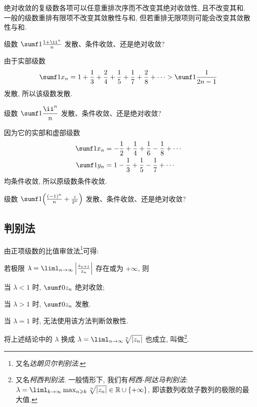 绝对收敛的复级数各项可以任意重排次序而不改变其绝对收敛性, 且不改变其和.
一般的级数重排有限项不改变其敛散性与和, 但若重排无限项则可能会改变其敛散性与和.

\begin{example}
  级数 $\sumf1 \frac{1+\ii ^n}n$ 发散、条件收敛、还是绝对收敛?
\end{example}

\begin{solution}
  由于实部级数
  \[
    \sumf1 x_n
    =1+\frac13+\frac24+\frac15+\frac17+\frac28+\cdots
    >\sumf1 \frac1{2n-1}
  \]
  发散, 所以该级数发散.
\end{solution}

\begin{example}
  \label{exam:lni}
  级数 $\sumf1 \dfrac{\ii ^n}n$ 发散、条件收敛、还是绝对收敛?
\end{example}

\begin{solution}
  因为它的实部和虚部级数
  \begin{align*}
    \sumf1 x_n&=-\half +\frac14+\frac16-\frac18+\cdots\\
    \sumf1 y_n&=1-\frac13+\frac15-\frac17+\cdots
  \end{align*}
  均条件收敛, 所以原级数条件收敛.
\end{solution}

\begin{exercise}
  级数 $\sumf1 \Bigl(\frac{(-1)^n}n+\frac i{2^n}\Bigr)$ 发散、条件收敛、还是绝对收敛?
\end{exercise}


\subsection{判别法}

由正项级数的比值审敛法\footnote{又名\emph{达朗贝尔判别法}.}可得:
\begin{theorem}[比值审敛法]
  若极限 $\lambda=\liml_{n\ra\infty}\abs{\frac{z_{n+1}}{z_n}}$ 存在或为 $+\infty$, 则
  \begin{enumpar}
    \item 当 $\lambda<1$ 时, $\sumf0 z_n$ 绝对收敛;
    \item 当 $\lambda>1$ 时, $\sumf0 z_n$ 发散.
  \end{enumpar}
\end{theorem}
当 $\lambda=1$ 时, 无法使用该方法判断敛散性.

将上述结论中的 $\lambda$ 换成 $\lambda=\liml_{n\ra\infty}\sqrt[n]{\abs{z_n}}$ 也成立, 叫做\footnote{
  又名\emph{柯西判别法}.
  一般情形下, 我们有\emph{柯西-阿达马判别法}: 
  $\lambda=\liml_{k\ra\infty}\max_{n\ge k}\sqrt[n]{\abs{z_n}}\in\BR\cup\{+\infty\}$, 即该数列收敛子数列的极限的最大值.
}.


